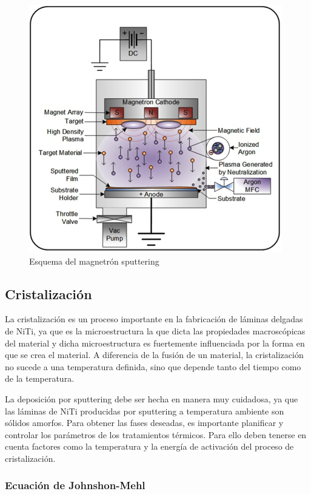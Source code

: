 \documentclass[12pt]{article}
\theoremstyle{definition}
\theoremstyle{remark}
\begin{document}
\begin{figure}[H]
	\centering
	\includegraphics[scale=1]{img/diagram-dc-magnatron.png}
	\caption{Esquema del magnetrón sputtering}
	\label{sputter}
\end{figure}

\subsection{Cristalización}

La cristalización es un proceso importante en la fabricación de láminas delgadas de NiTi, ya que es la microestructura la que dicta las propiedades macroscópicas del material y dicha microestructura es fuertemente influenciada por la forma en que se crea el material. A diferencia de la fusión de un material, la cristalización no sucede a una temperatura definida, sino que depende tanto del tiempo como de la temperatura.

La deposición por sputtering debe ser hecha en manera muy cuidadosa, ya que las láminas de NiTi producidas por sputtering a temperatura ambiente son sólidos amorfos. Para obtener las fases deseadas, es importante planificar y controlar los parámetros de los tratamientos térmicos. Para ello deben tenerse en cuenta factores como la temperatura y la energía de activación del proceso de cristalización.

\subsubsection{Ecuación de Johnshon-Mehl}
\end{document}
